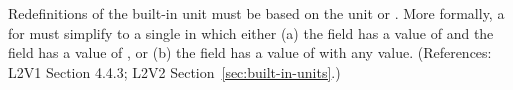 Redefinitions of the built-in unit  must be based on the unit
 or .  More formally, a \UnitDefinition
for  must simplify to a single \Unit in which either (a) the
 field has a value of  and the 
field has a value of , or (b) the  field has a value
of  with any  value.  (References:
L2V1 Section 4.4.3; L2V2 Section~\ref{sec:built-in-units}.)
